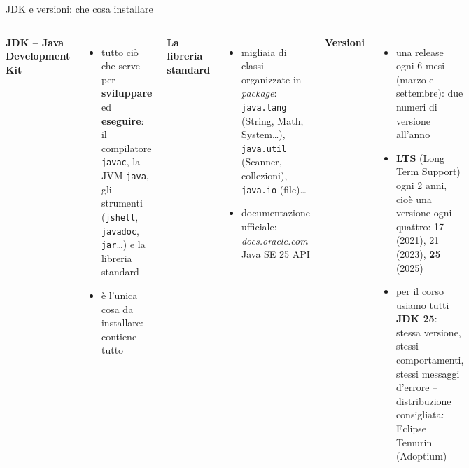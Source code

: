 \documentclass[10pt,aspectratio=169]{beamer}
\begin{document}
\begin{frame}{JDK e versioni: che cosa installare}
\begin{columns}[T]
\textbf{JDK -- Java Development Kit}
\begin{itemize}\itemsep=2pt
    \item tutto ciò che serve per \textbf{sviluppare} ed \textbf{eseguire}: il compilatore \texttt{javac}, la JVM \texttt{java}, gli strumenti (\texttt{jshell}, \texttt{javadoc}, \texttt{jar}\ldots) e la libreria standard
    \item è l'unica cosa da installare: contiene tutto
\end{itemize}

\vspace{0.2cm}
\textbf{La libreria standard}
\begin{itemize}\itemsep=2pt
    \item migliaia di classi organizzate in \emph{package}: \texttt{java.lang} (String, Math, System\ldots), \texttt{java.util} (Scanner, collezioni), \texttt{java.io} (file)\ldots
    \item documentazione ufficiale: \emph{docs.oracle.com} \textrightarrow{} Java SE 25 API
\end{itemize}

\textbf{Versioni}
\begin{itemize}\itemsep=2pt
    \item una release ogni 6 mesi (marzo e settembre): due numeri di versione all'anno
    \item \textbf{LTS} (Long Term Support) ogni 2 anni, cioè una versione ogni quattro: 17 (2021), 21 (2023), \textbf{25} (2025)
    \item per il corso usiamo tutti \textbf{JDK 25}: stessa versione, stessi comportamenti, stessi messaggi d'errore -- distribuzione consigliata: Eclipse Temurin (Adoptium)
\end{itemize}
\end{columns}
\end{frame}
\end{document}
